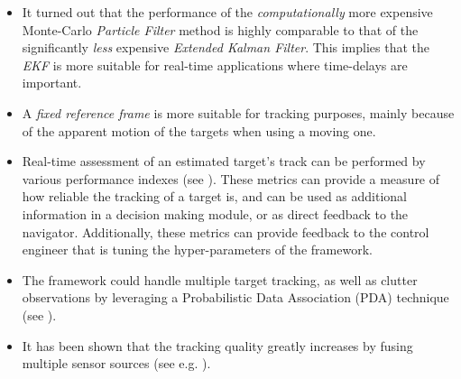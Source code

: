 \begin{itemize}
	\item It turned out that the performance of the \emph{computationally} more expensive Monte-Carlo \emph{Particle Filter} method is highly comparable to that of the significantly \emph{less} expensive \emph{Extended Kalman Filter}. This implies that the \emph{EKF} is more suitable for real-time applications where time-delays are important.
	\item A \emph{fixed reference frame} is more suitable for tracking purposes, mainly because of the apparent motion of the targets when using a moving one.
	\item Real-time assessment  of an estimated target's track can be performed by various performance indexes (see ). These metrics can provide a measure of how reliable the tracking of a target is, and can be used as additional information in a decision making module, or as direct feedback to the navigator. Additionally, these metrics can provide feedback to the control engineer that is tuning the hyper-parameters of the framework. 
	\item The framework could handle multiple target tracking, as well as clutter observations by leveraging a Probabilistic Data Association (PDA) technique (see ).
	\item It has been shown that the tracking quality greatly increases by fusing multiple sensor sources (see e.g. ).
\end{itemize}

